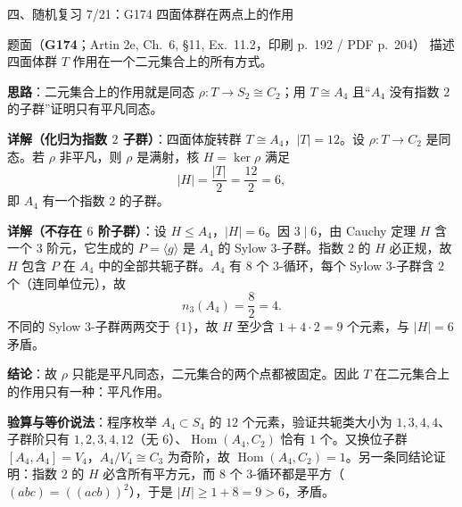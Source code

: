 \documentclass[aspectratio=169,10pt,fontset=none]{ctexbeamer}
\newcommand{\ex}[1]{\textcolor{accent}{\footnotesize\bfseries #1}}
\newcommand{\key}[1]{\textcolor{ink}{\bfseries #1}}
\begin{document}
\begin{frame}[t]{四、随机复习 7/21：G174 四面体群在两点上的作用}
\label{ex:G174}
\scriptsize
\begin{block}{\footnotesize 题面（\ex{G174}；Artin 2e, Ch.~6, §11, Ex.~11.2，印刷 p.~192 / PDF p.~204）}
描述四面体群 $T$ 作用在一个二元集合上的所有方式。
\end{block}
\key{思路}：二元集合上的作用就是同态 $\rho:T\to S_2\cong C_2$；用 $T\cong A_4$ 且“$A_4$ 没有指数 $2$ 的子群”证明只有平凡同态。

\key{详解（化归为指数 $2$ 子群）}：四面体旋转群 $T\cong A_4$，$|T|=12$。设 $\rho:T\to C_2$ 是同态。若 $\rho$ 非平凡，则 $\rho$ 是满射，核 $H=\ker\rho$ 满足
\[ |H|=\frac{|T|}{2}=\frac{12}{2}=6, \]
即 $A_4$ 有一个指数 $2$ 的子群。

\key{详解（不存在 $6$ 阶子群）}：设 $H\le A_4$，$|H|=6$。因 $3\mid6$，由 Cauchy 定理 $H$ 含一个 $3$ 阶元，它生成的 $P=\langle g\rangle$ 是 $A_4$ 的 Sylow $3$-子群。指数 $2$ 的 $H$ 必正规，故 $H$ 包含 $P$ 在 $A_4$ 中的全部共轭子群。$A_4$ 有 $8$ 个 $3$-循环，每个 Sylow $3$-子群含 $2$ 个（连同单位元），故
\[ n_3(A_4)=\frac{8}{2}=4. \]
不同的 Sylow $3$-子群两两交于 $\{1\}$，故 $H$ 至少含 $1+4\cdot2=9$ 个元素，与 $|H|=6$ 矛盾。

\key{结论}：故 $\rho$ 只能是平凡同态，二元集合的两个点都被固定。因此 $T$ 在二元集合上的作用只有一种：平凡作用。

\key{验算与等价说法}：程序枚举 $A_4\subset S_4$ 的 $12$ 个元素，验证共轭类大小为 $1,3,4,4$、子群阶只有 $1,2,3,4,12$（无 $6$）、$\operatorname{Hom}(A_4,C_2)$ 恰有 $1$ 个。又换位子群 $[A_4,A_4]=V_4$，$A_4/V_4\cong C_3$ 为奇阶，故 $\operatorname{Hom}(A_4,C_2)=1$。另一条同结论证明：指数 $2$ 的 $H$ 必含所有平方元，而 $8$ 个 $3$-循环都是平方（$(abc)=((acb))^2$），于是 $|H|\ge1+8=9>6$，矛盾。
\end{frame}

\end{document}
